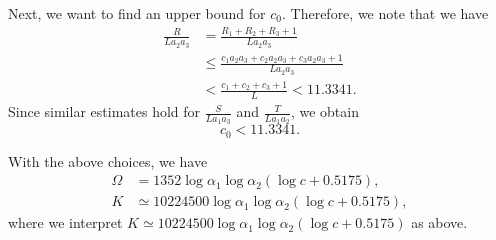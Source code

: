 \documentclass{amsart}
\theoremstyle{definition}
\begin{document}
Next, we want to find an upper bound for $c_0$. Therefore, we note that we have
\begin{align*}
\frac{R}{La_2a_3}&=\frac{R_1+R_2+R_3+1}{La_2a_3}\\
& \leq \frac{c_1 a_2a_3+c_2a_2a_3+c_3a_2a_3+1}{La_2a_3}\\
& <\frac{c_1+c_2+c_3+1}L<11.3341.
\end{align*}
Since similar estimates hold for $\frac{S}{La_1a_3}$ and $\frac{T}{La_1a_2}$, we obtain
$$c_0<11.3341.$$

With the above choices, we have
\begin{align*}
\Omega &= 1352\log \alpha_1\log \alpha_2 (\log c +0.5175),\\
K &\simeq 10224500\log \alpha_1\log \alpha_2 (\log c +0.5175),
\end{align*}
where we interpret $K \simeq 10224500\log \alpha_1\log \alpha_2 (\log c +0.5175)$ as above.
\end{document}
